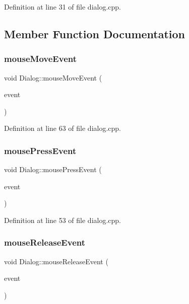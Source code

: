 Definition at line 31 of file dialog.\+cpp.



\subsection{Member Function Documentation}
\mbox{\label{class_dialog_aea6bb029efbb1eaa374bd938ff0afabf}} 
\subsubsection{\texorpdfstring{mouse\+Move\+Event}{mouseMoveEvent}}
{\footnotesize\ttfamily void Dialog\+::mouse\+Move\+Event (\begin{DoxyParamCaption}\item[{Q\+Mouse\+Event $\ast$}]{event }\end{DoxyParamCaption})\hspace{0.3cm}{\ttfamily [slot]}}



Definition at line 63 of file dialog.\+cpp.

\mbox{\label{class_dialog_a95aaa4d78bda5c07650d383d3c5292ac}} 
\subsubsection{\texorpdfstring{mouse\+Press\+Event}{mousePressEvent}}
{\footnotesize\ttfamily void Dialog\+::mouse\+Press\+Event (\begin{DoxyParamCaption}\item[{Q\+Mouse\+Event $\ast$}]{event }\end{DoxyParamCaption})\hspace{0.3cm}{\ttfamily [slot]}}



Definition at line 53 of file dialog.\+cpp.

\mbox{\label{class_dialog_a95158bddb719a98816c8432ddb096b27}} 
\subsubsection{\texorpdfstring{mouse\+Release\+Event}{mouseReleaseEvent}}
{\footnotesize\ttfamily void Dialog\+::mouse\+Release\+Event (\begin{DoxyParamCaption}\item[{Q\+Mouse\+Event $\ast$}]{event }\end{DoxyParamCaption})\hspace{0.3cm}{\ttfamily [slot]}}




